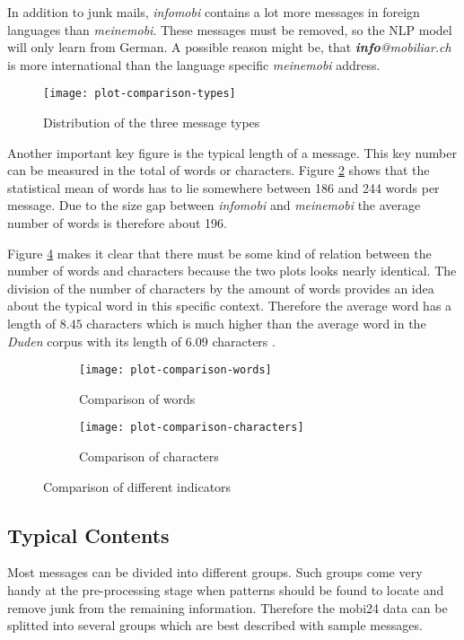 In addition to junk mails, \emph{infomobi} contains a lot more messages in foreign languages than \emph{meinemobi}. These messages
must be removed, so the NLP model will only learn from German. A possible reason might be, that \emph{\textbf{info}@mobiliar.ch}
is more international than the language specific \emph{meinemobi} address.

\begin{figure}[!ht]
    \centering
    \texttt{[image: plot-comparison-types]}
    \caption{Distribution of the three message types}
    \label{fig:plot-comparison-types}
\end{figure}

Another important key figure is the typical length of a message. This key number can be measured in the total of words or characters.
Figure \ref{fig:plot-comparison-words} shows that the statistical mean of words has to lie somewhere between 186 and 244 words per
message. Due to the size gap between \emph{infomobi} and \emph{meinemobi} the average number of words is therefore about 196.

Figure \ref{fig:plot-comparison-characters} makes it clear that there must be some kind of relation between the number of words
and characters because the two plots looks nearly identical. The division of the number of characters by the amount of words provides
an idea about the typical word in this specific context. Therefore the average word has a length of $8.45$ characters which is much 
higher than the average word in the \emph{\Gls{Duden}} corpus with its length of $6.09$ characters \cite{duden}.

\begin{figure}[!ht]
    \begin{subfigure}{0.5\textwidth}
        \texttt{[image: plot-comparison-words]} 
        \caption{Comparison of words}
        \label{fig:plot-comparison-words}
    \end{subfigure}
    \begin{subfigure}{0.5\textwidth}
        \texttt{[image: plot-comparison-characters]}
        \caption{Comparison of characters}
        \label{fig:plot-comparison-characters}
    \end{subfigure}
    \caption{Comparison of different indicators}
\end{figure}

\subsection{Typical Contents}
\label{chap:typical-contents}
Most messages can be divided into different groups. Such groups come very handy at the pre-processing stage when patterns should be
found to locate and remove junk from the remaining information. Therefore the mobi24 data can be splitted into several groups which
are best described with sample messages.

